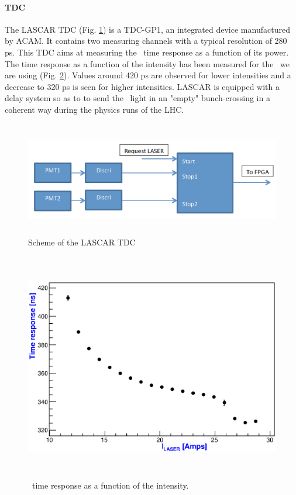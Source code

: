 \paragraph{TDC}
The LASCAR TDC (Fig. \ref{fig:laslascartdc}) is a TDC-GP1, an integrated device manufactured by ACAM. It contains two measuring channels with a typical resolution of 280 ps. This TDC aims at measuring the \las~time response as a function of its power. The time response as a function of the intensity has been measured for the \las~we are using (Fig. \ref{fig:lasresponse}). Values around 420 ps are observed for lower intensities and a decrease to 320 ps is seen for higher intensities. LASCAR is equipped with a delay system so as to to send the \las~light in an "empty" bunch-crossing in a coherent way during the physics runs of the LHC.

\begin{figure}[htbp]

\centering
\includegraphics[height=5cm]{figures/tdc.pdf}
\caption{Scheme of the LASCAR TDC}\label{fig:laslascartdc}
\end{figure}

\begin{figure}[htbp]
\centering
\includegraphics[height=10cm]{figures/laser_timing_new.eps}
\caption{\las~time response as a function of the intensity.}\label{fig:lasresponse}
\end{figure}

